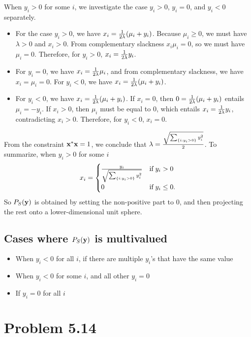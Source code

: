 \documentclass{scrartcl}
\begin{document}
When $y_i > 0$ for some $i$, we investigate the case $y_i > 0$, $y_i = 0$, and $y_i < 0$ separately.
\begin{itemize}
\item For the case $y_i > 0$, we have $x_i = {1 \over {2\lambda}} (\mu_i + y_i)$. Because $\mu_i \ge 0$,
we must have $\lambda > 0$ and $x_i > 0$. From complementary slackness $x_i\mu_i = 0$,
so we must have $\mu_i = 0$. Therefore, for $y_i > 0$, $x_i = {1 \over {2\lambda}} y_i$.
\item For $y_i = 0$, we have $x_i = {1 \over {2\lambda}} \mu_i$, and from complementary slackness,
we have $x_i = \mu_i = 0$. For $y_i < 0$, we have $x_i = {1 \over {2\lambda}} (\mu_i + y_i)$.
\item For $y_i < 0$, we have $x_i = {1 \over {2\lambda}} (\mu_i + y_i)$.
If $x_i = 0$, then $0 = {1 \over {2\lambda}} (\mu_i + y_i)$ entails
$\mu_i = -y_i$. If $x_i > 0$, then $\mu_i$ must be equal to 0, which entails 
$x_i = {1 \over {2\lambda}} y_i$, contradicting $x_i > 0$. Therefore, for $y_i < 0$, $x_i = 0$.
\end{itemize}
From the constraint $\mathbf{x}^*\mathbf{x} = 1$, we conclude that
$\lambda = {\sqrt{\sum_{\{i:y_i > 0\}}  y_i^2} \over 2}$. To summarize, when $y_i > 0$ for some $i$
\begin{equation}
x_i = \begin{cases}
        {y_i \over \sqrt{\sum_{\{i:y_i > 0\}}  y_i^2}} & \text{if} \; y_i > 0 \\
        0 & \text{if} \; y_i \le 0 .
      \end{cases}
\end{equation}
So $P_{S}(\mathbf{y})$ is obtained by setting the non-positive part to 0, and then projecting the rest
onto a lower-dimensional unit sphere.

\subsection*{Cases where $P_S(\mathbf{y})$ is multivalued}

\begin{itemize}
\item When $y_i < 0$ for all $i$, if there are multiple $y_i$'s that have the same value
\item When $y_i < 0$ for some $i$, and all other $y_i = 0$
\item If $y_i = 0$ for all $i$
\end{itemize}


\section*{Problem 5.14}
\end{document}
